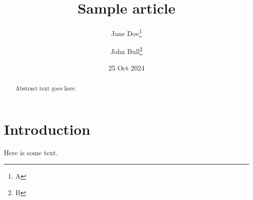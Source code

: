 \documentclass{article}
\title{Sample article}
\author{Jane Doe\thanks{A} \and John Bull\thanks{B}}
\date{25 Oct 2024}
\begin{document}
\maketitle

\begin{abstract}
Abstract text goes here.
\end{abstract}

\section{Introduction}

Here is some text.
\end{document}
